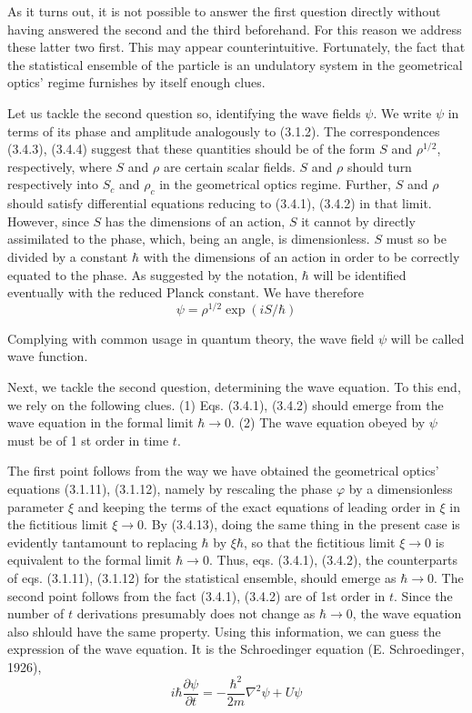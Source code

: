 \documentclass{article}
\begin{document}
As it turns out, it is not possible to answer the first question directly without having answered the second and the third beforehand. For this reason we address these latter two first. This may appear counterintuitive. Fortunately, the fact that the statistical ensemble of the particle is an undulatory system in the geometrical optics' regime furnishes by itself enough clues.

Let us tackle the second question so, identifying the wave fields $\psi$. We write $\psi$ in terms of its phase and amplitude analogously to (3.1.2). The correspondences (3.4.3), (3.4.4) suggest that these quantities should be of the form $S$ and $\rho^{1 / 2}$, respectively, where $S$ and $\rho$ are certain scalar fields. $S$ and $\rho$ should turn respectively into $S_{c}$ and $\rho_{c}$ in the geometrical optics regime. Further, $S$ and $\rho$ should satisfy differential equations reducing to (3.4.1), (3.4.2) in that limit. However, since $S$ has the dimensions of an action, $S$ it cannot by directly assimilated to the phase, which, being an angle, is dimensionless. $S$ must so be divided by a constant $\hbar$ with the dimensions of an action in order to be correctly equated to the phase. As suggested by the notation, $\hbar$ will be identified eventually with the reduced Planck constant. We have therefore
$$
\begin{equation*}
\psi=\rho^{1 / 2} \exp (i S / \hbar) \tag{3.4.13}
\end{equation*}
$$

Complying with common usage in quantum theory, the wave field $\psi$ will be called wave function.

Next, we tackle the second question, determining the wave equation. To this end, we rely on the following clues.
(1) Eqs. (3.4.1), (3.4.2) should emerge from the wave equation in the formal limit $\hbar \rightarrow 0$.
(2) The wave equation obeyed by $\psi$ must be of 1 st order in time $t$.

The first point follows from the way we have obtained the geometrical optics' equations (3.1.11), (3.1.12), namely by rescaling the phase $\varphi$ by a dimensionless parameter $\xi$ and keeping the terms of the exact equations of leading order in $\xi$ in the fictitious limit $\xi \rightarrow 0$. By (3.4.13), doing the same thing in the present case is evidently tantamount to replacing $\hbar$ by $\xi \hbar$, so that the fictitious limit $\xi \rightarrow 0$ is equivalent to the formal limit $\hbar \rightarrow 0$. Thus, eqs. (3.4.1), (3.4.2), the counterparts of eqs. (3.1.11), (3.1.12) for the statistical ensemble, should emerge as $\hbar \rightarrow 0$. The second point follows from the fact (3.4.1), (3.4.2) are of 1st order in $t$. Since the number of $t$ derivations presumably does not change as $\hbar \rightarrow 0$, the wave equation also shlould have the same property. Using this information, we can guess the expression of the wave equation. It is the Schroedinger equation (E. Schroedinger, 1926),
$$
\begin{equation*}
i \hbar \frac{\partial \psi}{\partial t}=-\frac{\hbar^{2}}{2 m} \nabla^{2} \psi+U \psi \tag{3.4.14}
\end{equation*}
$$
\end{document}
